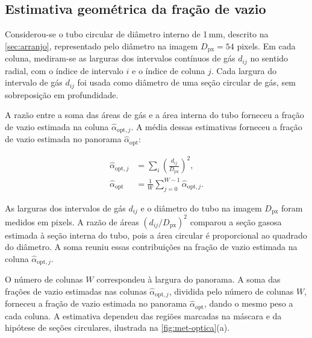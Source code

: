 \subsection{Estimativa geométrica da fração de vazio}\label{sec:met-geometria-optica}

Considerou-se o tubo circular de diâmetro interno de 1\,mm, descrito na
\autoref{sec:arranjo}, representado pelo diâmetro na imagem
$D_{\mathrm{px}}=54$ pixels. Em cada coluna, mediram-se as larguras dos
intervalos contínuos de gás $d_{ij}$ no sentido radial, com o índice de
intervalo $i$ e o índice de coluna $j$. Cada largura do intervalo de gás
$d_{ij}$ foi usada como diâmetro de uma seção circular de gás, sem
sobreposição em profundidade.

A razão entre a soma das áreas de gás e a área interna do tubo forneceu
a fração de vazio estimada na coluna $\widehat\alpha_{\mathrm{opt},j}$.
A média dessas estimativas forneceu a fração de vazio estimada no panorama
$\widehat\alpha_{\mathrm{opt}}$:\nopagebreak[4]

\begin{equation}\label{eq:met-void}
 \begin{aligned}
 \widehat\alpha_{\mathrm{opt},j}
 &=\sum_i\left(\frac{d_{ij}}{D_{\mathrm{px}}}\right)^2,\\
 \widehat\alpha_{\mathrm{opt}}
 &=\frac{1}{W}\sum_{j=0}^{W-1}\widehat\alpha_{\mathrm{opt},j}.
 \end{aligned}
\end{equation}

\noindent
As larguras dos intervalos de gás $d_{ij}$ e o diâmetro do tubo na imagem
$D_{\mathrm{px}}$ foram medidos em pixels. A razão de áreas
$(d_{ij}/D_{\mathrm{px}})^2$ comparou a seção gasosa estimada à seção interna
do tubo, pois a área circular é proporcional ao quadrado do diâmetro.
A soma reuniu essas contribuições
na fração de vazio estimada na coluna $\widehat\alpha_{\mathrm{opt},j}$.

O número de colunas $W$ correspondeu à largura do panorama. A soma das
frações de vazio estimadas nas colunas $\widehat\alpha_{\mathrm{opt},j}$,
dividida pelo número de colunas $W$, forneceu a fração de vazio estimada no
panorama $\widehat\alpha_{\mathrm{opt}}$, dando o mesmo peso a cada coluna.
A estimativa dependeu das regiões marcadas na máscara e da hipótese de
seções circulares, ilustrada na \autoref{fig:met-optica}(a).

